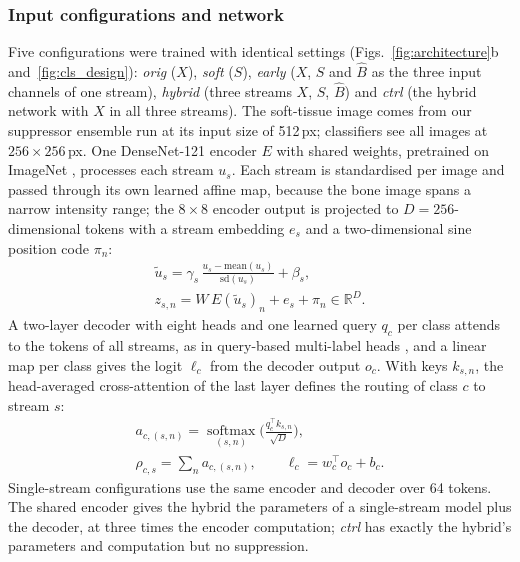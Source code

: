 \subsubsection{Input configurations and network}
Five configurations were trained with identical settings (Figs.~\ref{fig:architecture}b and~\ref{fig:cls_design}):
\emph{orig} ($X$), \emph{soft} ($S$), \emph{early} ($X$, $S$ and $\hat B$ as the three input channels of one stream), \emph{hybrid} (three
streams $X$, $S$, $\hat B$) and \emph{ctrl} (the hybrid network with $X$ in all three streams). The soft-tissue image comes from our
suppressor ensemble run at its input size of 512\,px; classifiers see all images at $256\times256$\,px. One DenseNet-121 encoder $E$
\cite{huang2017densenet} with shared weights, pretrained on ImageNet \cite{deng2009imagenet,wightman2019timm}, processes each stream $u_s$.
Each stream is standardised per image and passed through its own learned affine map, because the bone image spans a narrow intensity range;
the $8\times8$ encoder output is projected to $D=256$-dimensional tokens with a stream embedding $e_s$ and a two-dimensional sine position
code $\pi_n$:
\begin{equation}
\begin{gathered}
\tilde u_s=\gamma_s\,\frac{u_s-\mathrm{mean}(u_s)}{\mathrm{sd}(u_s)}+\beta_s,\\
z_{s,n}=W\,E(\tilde u_s)_n+e_s+\pi_n\in\mathbb{R}^{D}.
\end{gathered}
\label{eq:tokens}
\end{equation}
A two-layer decoder with eight heads and one learned query $q_c$ per class attends to the tokens of all streams, as in query-based
multi-label heads \cite{liu2021query2label,ridnik2023mldecoder}, and a linear map per class gives the logit $\ell_c$ from the decoder
output $o_c$. With keys $k_{s,n}$, the head-averaged cross-attention of the last layer defines the routing of class $c$ to stream $s$:
\begin{equation}
\begin{gathered}
a_{c,(s,n)}=\operatorname*{softmax}_{(s,n)}\Big(\frac{q_c^{\top}k_{s,n}}{\sqrt{D}}\Big),\\
\rho_{c,s}=\sum_{n}a_{c,(s,n)},\qquad
\ell_c=w_c^{\top}o_c+b_c.
\end{gathered}
\label{eq:routing}
\end{equation}
Single-stream configurations use the same encoder and decoder over 64 tokens. The shared encoder gives the hybrid the parameters of a
single-stream model plus the decoder, at three times the encoder computation; \emph{ctrl} has exactly the hybrid's parameters and
computation but no suppression.

